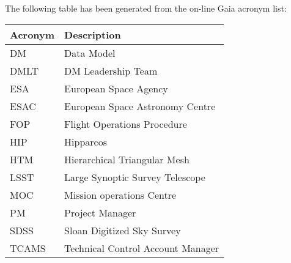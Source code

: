 The following table has been generated from the on-line Gaia acronym list:
\newline\newline%
\addtocounter{table}{-1}
\begin{longtable}{|l|p{}|}\hline 
\textbf{Acronym} & \textbf{Description}  \\\hline
DM&Data Model \\\hline
DMLT&DM Leadership Team \\\hline
ESA&European Space Agency \\\hline
ESAC&European Space Astronomy Centre \\\hline
FOP&Flight Operations Procedure \\\hline
HIP&Hipparcos \\\hline
HTM&Hierarchical Triangular Mesh \\\hline
LSST&Large Synoptic Survey Telescope \\\hline
MOC&Mission operations Centre \\\hline
PM&Project Manager \\\hline
SDSS&Sloan Digitized Sky Survey \\\hline
TCAMS&Technical Control Account Manager \\\hline
\end{longtable} 

